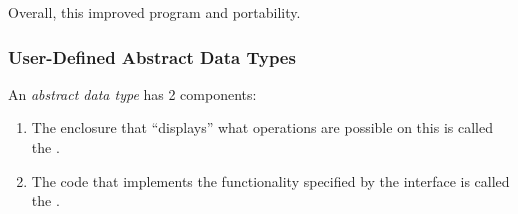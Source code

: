 Overall, this improved program  and portability.

\subsubsection{User-Defined Abstract Data Types}\label{subsubsec:User_Defined_Abstract_Data_Types}
\begin{definition}\label{def:Abstract_Data_Type}
  An \emph{abstract data type} has 2 components:
  \begin{enumerate}[noitemsep]
  \item The enclosure that ``displays'' what operations are possible on this  is called the .
  \item The code that implements the functionality specified by the interface is called the .
  \end{enumerate}


\end{definition}
